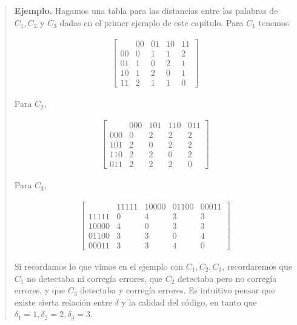 \documentclass[a4paper]{article}
\begin{document}
\small
\begin{quote}

\textbf{Ejemplo.} Hagamos una tabla para las distancias entre las palabras de $C_1, C_2$ y $C_3$
dadas en el primer ejemplo de este capítulo. Para $C_1$ tenemos

\begin{align*}
    \begin{bmatrix} 
         & 00 & 01 &10 &11 \\ 
        00 & 0 & 1 & 1 & 2  \\ 
        01 & 1 & 0 & 2 & 1 \\ 
        10 & 1 & 2 & 0 & 1 \\ 
        11 & 2 & 1 & 1 & 0
    \end{bmatrix} 
\end{align*}

Para $C_2$, 

\begin{align*}
    \begin{bmatrix} 
         & 000 & 101 & 110 & 011 \\ 
        000 & 0 & 2 & 2 & 2  \\ 
        101 & 2 & 0 & 2 & 2 \\ 
        110 & 2 & 2 & 0 & 2 \\ 
        011 & 2 & 2 & 2 & 0
    \end{bmatrix} 
\end{align*}

Para $C_3$,

\begin{align*}
    \begin{bmatrix} 
         & 11111 & 10000 & 01100 & 00011 \\ 
        11111 & 0 & 4 & 3 & 3  \\ 
        10000 & 4 & 0 & 3 & 3 \\ 
        01100 & 3 & 3 & 0 & 4 \\ 
        00011 & 3 & 3 & 4 & 0
    \end{bmatrix} 
\end{align*}

Si recordamos lo que vimos en el ejemplo con $C_1, C_2, C_3$,
recordaremos que $C_1$ no detectaba ni corregía errores, 
que $C_2$ detectaba pero no corregía errores, y que $C_3$
detectaba y corregía errores. Es intuitivo pensar que 
existe cierta relación entre $\delta$ y la calidad del 
código, en tanto que $\delta_1 = 1, \delta_2 = 2, \delta_3 = 3$.


\end{quote}
\normalsize
\end{document}
